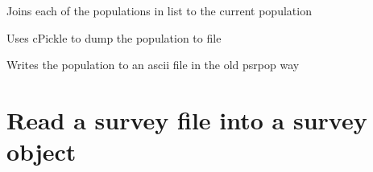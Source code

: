 \documentclass[letterpaper,10pt,english]{sphinxmanual}
\begin{document}

\begin{fulllineitems}
\label{\detokenize{module-level-docs:population.Population.join}}
\pysigstartsignatures
\pysiglinewithargsret
{}
{}
{}
\pysigstopsignatures
\sphinxAtStartPar
Joins each of the populations in list  to the current population

\end{fulllineitems}


\begin{fulllineitems}
\label{\detokenize{module-level-docs:population.Population.write}}
\pysigstartsignatures
\pysiglinewithargsret
{}
{}
{}
\pysigstopsignatures
\sphinxAtStartPar
Uses cPickle to dump the population to file 

\end{fulllineitems}


\begin{fulllineitems}
\label{\detokenize{module-level-docs:population.Population.write_asc}}
\pysigstartsignatures
\pysiglinewithargsret
{}
{}
{}
\pysigstopsignatures
\sphinxAtStartPar
Writes the population to an ascii file in the old psrpop way

\end{fulllineitems}



\section{ \textendash{} Read a survey file into a survey object}
\label{\detokenize{module-level-docs:module-survey}}\label{\detokenize{module-level-docs:survey-read-a-survey-file-into-a-survey-object}}\label{\detokenize{module-level-docs:survey-module-docs}}
\end{document}
